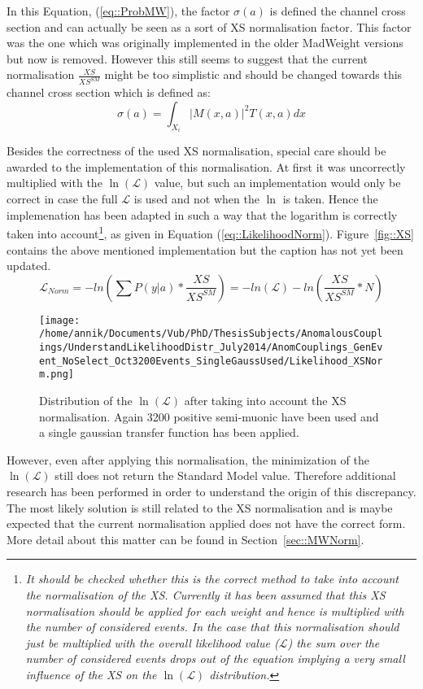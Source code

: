 In this Equation, (\ref{eq::ProbMW}), the factor $\sigma(a)$ is defined the channel cross section and can actually be seen as a sort of XS normalisation factor. This factor was the one which was originally implemented in the older MadWeight versions but now is removed. However this still seems to suggest that the current normalisation $\frac{XS}{XS^{SM}}$ might be too simplistic and should be changed towards this channel cross section which is defined as:
\begin{equation}\label{eq::ChannelXSMW}
 \sigma(a) = \int_{X_i} \vert M(x,a) \vert^{2} T(x,a) dx
\end{equation}

Besides the correctness of the used XS normalisation, special care should be awarded to the implementation of this normalisation. At first it was uncorrectly multiplied with the $\ln(\mathcal{L})$ value, but such an implementation would only be correct in case the full $\mathcal{L}$ is used and not when the $\ln$ is taken. 
Hence the implemenation has been adapted in such a way that the logarithm is correctly taken into account\footnote{\textit{It should be checked whether this is the correct method to take into account the normalisation of the XS. Currently it has been assumed that this XS normalisation should be applied for each weight and hence is multiplied with the number of considered events. In the case that this normalisation should just be multiplied with the overall likelihood value ($\mathcal{L}$) the sum over the number of considered events drops out of the equation implying a very small influence of the XS on the $\ln(\mathcal{L})$ distribution.}}, as given in Equation (\ref{eq::LikelihoodNorm}). 
Figure~\ref{fig::XS} contains the above mentioned implementation but the caption has not yet been updated. 
\begin{equation}\label{eq::LikelihoodNorm}
 \mathcal{L}_{Norm} = - ln(\sum P(y \vert a)*\frac{XS}{XS^{SM}}) = -ln(\mathcal{L}) - ln(\frac{XS}{XS^{SM}}*N)
\end{equation}

\begin{figure}[!h]
 \texttt{[image: /home/annik/Documents/Vub/PhD/ThesisSubjects/AnomalousCouplings/UnderstandLikelihoodDistr\_July2014/AnomCouplings\_GenEvent\_NoSelect\_Oct3200Events\_SingleGaussUsed/Likelihood\_XSNorm.png]}
 \caption{Distribution of the $\ln(\mathcal{L})$ after taking into account the XS normalisation. Again 3200 positive semi-muonic have been used and a single gaussian transfer function has been applied.}
 \label{fig::LikelihoodNorm}
\end{figure}
However, even after applying this normalisation, the minimization of the $\ln(\mathcal{L})$ still does not return the Standard Model value. Therefore additional research has been performed in order to understand the origin of this discrepancy. The most likely solution is still related to the XS normalisation and is maybe expected that the current normalisation applied does not have the correct form. More detail about this matter can be found in Section~\ref{sec::MWNorm}.


